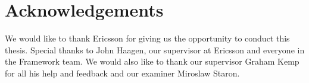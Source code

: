 \thispagestyle{plain}			%
\section*{Acknowledgements}
We would like to thank Ericsson for giving us the opportunity to conduct this thesis. Special thanks to John Haagen, our supervisor at Ericsson and everyone in the Framework team. We would also like to thank our supervisor Graham Kemp for all his help and feedback and our examiner Miroslaw Staron. 

\vspace{1.5cm}
\hfill

\newpage				%
\thispagestyle{empty}
\mbox{}